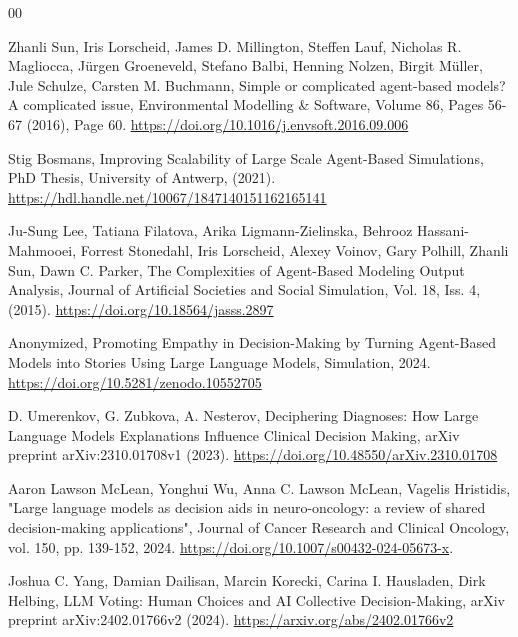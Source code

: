 \documentclass[preprint,12pt]{elsarticle}
\begin{document}
\begin{thebibliography}{00}


Zhanli Sun, Iris Lorscheid, James D. Millington, Steffen Lauf, Nicholas R. Magliocca, Jürgen Groeneveld, Stefano Balbi, Henning Nolzen, Birgit Müller, Jule Schulze, Carsten M. Buchmann,
Simple or complicated agent-based models? A complicated issue,
Environmental Modelling & Software, Volume 86, Pages 56-67 (2016), Page 60.
\href{https://doi.org/10.1016/j.envsoft.2016.09.006}{https://doi.org/10.1016/j.envsoft.2016.09.006}


Stig Bosmans, Improving Scalability of Large Scale Agent-Based Simulations, PhD Thesis, University of Antwerp, (2021).
\href{https://hdl.handle.net/10067/1847140151162165141}{https://hdl.handle.net/10067/1847140151162165141}

Ju-Sung Lee, Tatiana Filatova, Arika Ligmann-Zielinska, Behrooz Hassani-Mahmooei, Forrest Stonedahl, Iris Lorscheid, Alexey Voinov, Gary Polhill, Zhanli Sun, Dawn C. Parker,
The Complexities of Agent-Based Modeling Output Analysis,
Journal of Artificial Societies and Social Simulation, Vol. 18, Iss. 4, (2015).
\href{https://doi.org/10.18564/jasss.2897}{https://doi.org/10.18564/jasss.2897}

Anonymized,
Promoting Empathy in Decision-Making by Turning Agent-Based Models into Stories Using Large Language Models,
Simulation, 2024.
\href{https://doi.org/10.5281/zenodo.10552705}{https://doi.org/10.5281/zenodo.10552705}



D. Umerenkov, G. Zubkova, A. Nesterov,
Deciphering Diagnoses: How Large Language Models Explanations Influence Clinical Decision Making,
arXiv preprint arXiv:2310.01708v1 (2023).
\href{https://doi.org/10.48550/arXiv.2310.01708}{https://doi.org/10.48550/arXiv.2310.01708}

Aaron Lawson McLean, Yonghui Wu, Anna C. Lawson McLean, Vagelis Hristidis,
"Large language models as decision aids in neuro-oncology: a review of shared decision-making applications",
Journal of Cancer Research and Clinical Oncology, vol. 150, pp. 139-152, 2024.
\href{https://doi.org/10.1007/s00432-024-05673-x}{https://doi.org/10.1007/s00432-024-05673-x}.

Joshua C. Yang, Damian Dailisan, Marcin Korecki, Carina I. Hausladen, Dirk Helbing,
LLM Voting: Human Choices and AI Collective Decision-Making,
arXiv preprint arXiv:2402.01766v2 (2024).
\href{https://arxiv.org/abs/2402.01766v2}{https://arxiv.org/abs/2402.01766v2}


\end{thebibliography}
\end{document}
